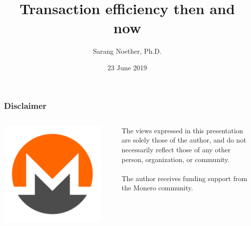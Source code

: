 \documentclass[aspectratio=169]{beamer}
\title[Transaction efficiency then and now]{Transaction efficiency then and now}
\author{Sarang Noether, Ph.D.}
\date{23 June 2019}
\institute{Monero Konferenco}
\begin{document}
\begin{frame}[plain]
\maketitle
\end{frame}


\begin{frame}
\frametitle{Disclaimer}
\begin{columns}
\begin{column}{0.2\textwidth}
\includegraphics[width=0.9\textwidth]{monero.png}
\end{column}
\begin{column}{0.8\textwidth}
The views expressed in this presentation are solely those of the author, and do not necessarily reflect those of any other person, organization, or community. \\~\\

The author receives funding support from the Monero community.
\end{column}
\end{columns}
\end{frame}
\end{document}
